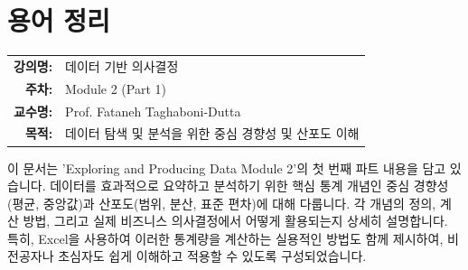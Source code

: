 \documentclass[11pt,a4paper]{book}
\makeatletter
\theoremstyle{definition}
\newcommand{\metainfo}[4]{
\begin{tcolorbox}[
    colback=lightpurple,
    colframe=darkpurple,
    boxrule=1pt,
    arc=2mm,
    left=10pt,
    right=10pt,
    top=8pt,
    bottom=8pt
]
\begin{tabular}{@{}rl@{}}
\textbf{강의명:} & #1 \\[0.3em]
\textbf{주차:} & #2 \\[0.3em]
\textbf{교수명:} & #3 \\[0.3em]
\textbf{목적:} & \begin{minipage}[t]{0.75\textwidth}#4\end{minipage}
\end{tabular}
\end{tcolorbox}
}
\makeatother
\begin{document}
\chapter{용어 정리}
\label{ch:module2}

\metainfo{데이터 기반 의사결정}{Module 2 (Part 1)}{Prof. Fataneh Taghaboni-Dutta}{데이터 탐색 및 분석을 위한 중심 경향성 및 산포도 이해}


\begin{overviewbox}
이 문서는 'Exploring and Producing Data Module 2'의 첫 번째 파트 내용을 담고 있습니다.
데이터를 효과적으로 요약하고 분석하기 위한 핵심 통계 개념인 중심 경향성(평균, 중앙값)과 산포도(범위, 분산, 표준 편차)에 대해 다룹니다.
각 개념의 정의, 계산 방법, 그리고 실제 비즈니스 의사결정에서 어떻게 활용되는지 상세히 설명합니다.
특히, Excel을 사용하여 이러한 통계량을 계산하는 실용적인 방법도 함께 제시하여, 비전공자나 초심자도 쉽게 이해하고 적용할 수 있도록 구성되었습니다.
\end{overviewbox}
\end{document}
